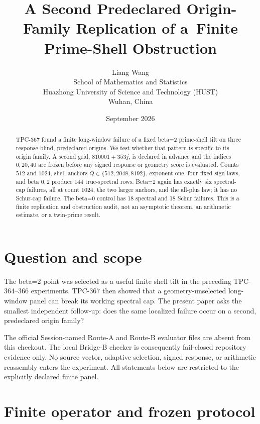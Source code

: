 \documentclass[10pt]{article}
\title{A Second Predeclared Origin-Family Replication of a\
Finite Prime-Shell Obstruction}
\author{Liang Wang\\
\small School of Mathematics and Statistics\\
\small Huazhong University of Science and Technology (HUST)\\
\small Wuhan, China}
\date{September 2026}
\begin{document}
\maketitle

\begin{abstract}
TPC-367 found a finite long-window failure of a fixed beta=2 prime-shell
tilt on three response-blind, predeclared origins.  We test whether that
pattern is specific to its origin family.  A second grid,
$810001+353j$, is declared in advance and the indices $0,20,40$ are frozen
before any signed response or geometry score is evaluated.  Counts $512$ and
$1024$, shell anchors $Q\in\{512,2048,8192\}$, exponent one, four fixed
sign laws, and beta $0,2$ produce 144 true-spectral rows.  Beta=2 again has
exactly six spectral-cap failures, all at count 1024, the two larger anchors,
and the all-plus law; it has no Schur-cap failure.  The beta=0 control has 18
spectral and 18 Schur failures.  This is a finite replication and obstruction
audit, not an asymptotic theorem, an arithmetic estimate, or a twin-prime
result.
\end{abstract}

\section{Question and scope}

The beta=2 point was selected as a useful finite shell tilt in the preceding
TPC-364--366 experiments.  TPC-367 then showed that a geometry-unselected
long-window panel can break its working spectral cap.  The present paper
asks the smallest independent follow-up: does the same localized failure
occur on a second, predeclared origin family?

The official Session-named Route-A and Route-B evaluator files are absent
from this checkout.  The local Bridge-B checker is consequently fail-closed
repository evidence only.  No source vector, adaptive selection, signed
response, or arithmetic reassembly enters the experiment.  All statements
below are restricted to the explicitly declared finite panel.

\section{Finite operator and frozen protocol}
\end{document}
